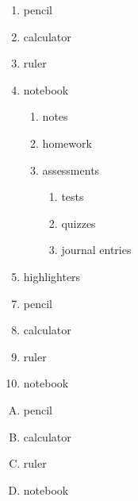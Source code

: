 \documentclass[11pt]{article}
\begin{document}

\begin{enumerate}
    \item pencil
    \item calculator
    \item ruler
    \item notebook
    \begin{enumerate}
        \item notes
        \item homework
        \item assessments
        \begin{enumerate}
            \item tests
            \item quizzes
            \item journal entries
        \end{enumerate}
    \end{enumerate}
\item highlighters
\end{enumerate}

\begin{enumerate} \setcounter{enumi}{6}
    \item pencil
    \item calculator
    \item ruler
    \item notebook
\end{enumerate}

\begin{enumerate}[A.]
    \item pencil
    \item calculator
    \item ruler
    \item notebook
\end{enumerate}
\end{document}
